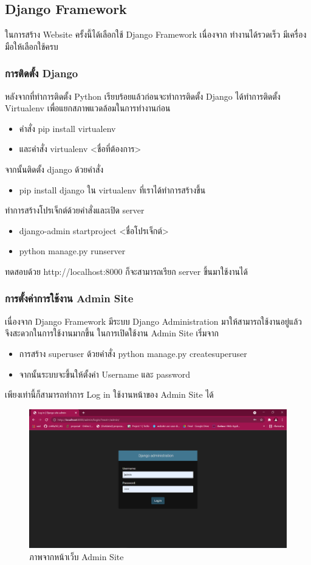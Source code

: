\subsection{Django Framework}
ในการสร้าง Website ครั้งนี้ได้เลือกใช้ Django Framework เนื่องจาก
ทำงานได้รวดเร็ว มีเครื่องมือให้เลือกใช้ครบ

\subsubsection{การติดตั้ง Django}
หลังจากที่ทำการติดตั้ง Python เรียบร้อยแล้วก่อนจะทำการติดตั้ง Django ได้ทำการติดตั้ง Virtualenv เพื่อแยกสภาพแวดล้อมในการทำงานก่อน 
\begin{itemize}
    \item คำสั่ง pip install virtualenv
    \item และคำสั่ง virtualenv <ชื่อที่ต้องการ>
\end{itemize}
จากนั้นติดตั้ง django ด้วยคำสั่ง 
\begin{itemize}
    \item pip install django ใน virtualenv ที่เราได้ทำการสร้างขึ้น
\end{itemize}
ทำการสร้างโปรเจ็กต์ด้วยคำสั่งและเปิด server 
\begin{itemize}
    \item django-admin startproject <ชื่อโปรเจ็กต์>
    \item python manage.py runserver
\end{itemize}
ทดสอบด้วย http://localhost:8000 ก็จะสามารถเรียก server ขึ้นมาใช้งานได้

\subsubsection{การตั้งค่าการใช้งาน Admin Site}
เนื่องจาก Django Framework มีระบบ Django Administration มาให้สามารถใช้งานอยู่แล้ว จึงสะดวกในการใช้งานมากขึ้น
ในการเปิดใช้งาน Admin Site เริ่มจาก
\begin{itemize}
    \item การสร้าง superuser ด้วยคำสั่ง python manage.py createsuperuser
    \item จากนั้นระบบจะขึ้นให้ตั้งค่า Username และ password
\end{itemize}
เพียงเท่านี้ก็สามารถทำการ Log in ใช้งานหน้าของ Admin Site ได้
\newpage

\begin{figure}[!thb]
	\captionsetup{justification=centering}
	\centering
	\includegraphics[width=5in]{figures/admin.png}
	\caption{ภาพจากหน้าเว็บ Admin Site}
	\label{figure:admin}
\end{figure}

